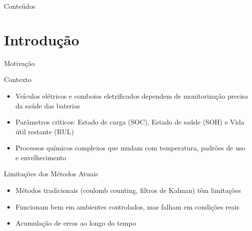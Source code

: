 \documentclass[aspectratio=169,xcolor=dvipsnames]{beamer}
\begin{document}
\begin{frame}[plain]
  \titlepage
\end{frame}

\begin{frame}[plain]{Conteúdos}
  \tableofcontents
\end{frame}

\section{Introdução}
\begin{frame}{Motivação}
  \begin{block}{Contexto}
    \begin{itemize}
      \item Veículos elétricos e comboios eletrificados dependem de monitorização precisa da saúde das baterias
      \item Parâmetros críticos: Estado de carga (SOC), Estado de saúde (SOH) e Vida útil restante (RUL)
      \item Processos químicos complexos que mudam com temperatura, padrões de uso e envelhecimento
    \end{itemize}
  \end{block}
  
  \begin{alertblock}{Limitações dos Métodos Atuais}
    \begin{itemize}
      \item Métodos tradicionais (coulomb counting, filtros de Kalman) têm limitações
      \item Funcionam bem em ambientes controlados, mas falham em condições reais
      \item Acumulação de erros ao longo do tempo
    \end{itemize}
  \end{alertblock}
\end{frame}
\end{document}

